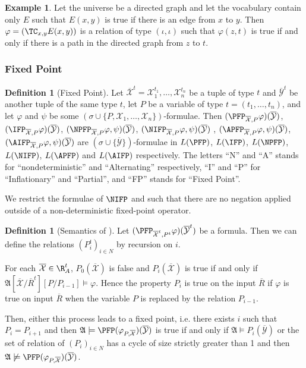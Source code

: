 \documentclass[a4paper,12pt]{article}
\newcommand{\sss}[1]{\subsubsection{#1}}
\newcommand{\emphdex}[1]{\index{#1}\emph{#1}}
\theoremstyle{definition}
\newtheorem{example}[theorem]{Example}
\newtheorem{definition}[theorem]{Definition}
\renewcommand{\phi}{\varphi}
\newcommand{\mc}{\mathcal}
\newcommand{\mf}{\mathfrak}
\newcommand{\ol}{\overline}
\newcommand{\olmc}[1]{\overline{\mathcal{#1}}}
\begin{document}
\begin{example}
  Let the universe be a directed graph and let the vocabulary contain
  only $E$ such that $E(x,y)$ is true if there is an edge from $x$ to
  $y$. Then $\phi=(\TC_{x,y}E(x,y))$ is a relation of type
  $(\iota,\iota)$ such that $\phi(z,t)$ is true if and only if there
  is a path  in the directed graph from $z$ to $t$.
\end{example}

\sss{Fixed Point}
\begin{definition}[Fixed Point]
  Let $\olmc {X}^{t}=\mc X_1^{t_1},\dots,\mc X_n^{t_n}$ be a tuple of
  type $t$ and $\olmc{Y}^{t}$ be another tuple of the same type $t$,
  let $P$ be a variable of type $t=(t_{1},\dots,t_{n})$, and let
  $\phi$ and $\psi$ be some $(\sigma\cup\{P,\mc X_{1},\dots,\mc
  X_{n}\})$-formulae. Then $(\PFP_{\olmc X,P}\phi)(\olmc Y)$,
  $(\IFP_{\olmc X,P}\phi)(\olmc Y)$, $(\NPFP_{\olmc
    X,P}\phi,\psi)(\olmc Y)$, $(\NIFP_{\olmc X,P}\phi,\psi)(\olmc Y)$
  , $(\APFP_{\olmc X,P}\phi,\psi)(\olmc Y)$, $(\AIFP_{\olmc
    X,P}\phi,\psi)(\olmc Y)$ are $(\sigma\cup\{\olmc Y\})$-formulae in
  \emphdex{$L(\PFP)$}, \emphdex{$L(\IFP)$}, \emphdex{$L(\NPFP)$},
  \emphdex{$L(\NIFP)$}, \emphdex{$L(\APFP)$} and \emphdex{$L(\AIFP)$}
  respectively. The letters ``N'' and ``A'' stands for
  ``nondeterministic'' and ``Alternating'' respectively, ``I'' and
  ``P'' for ``Inflationary'' and ``Partial'', and ``FP'' stands for
  ``Fixed Point''.



  We restrict the formulae of $\NIFP$ and \NPFP{} such that there are no
  negation applied outside of a non-deterministic fixed-point
  operator.
\end{definition}

\begin{definition}[Semantics of \PFP]
  Let $(\PFP_{\olmc X^{t},P^{t}}\phi)(\olmc Y^{t})$ be a formula. Then we can
  define the relations $(P_{i}^{t})_{i\in N}$ by recursion on $i$.

  For each $\olmc X\in\R^{t}_{A}$, $P_0(\olmc X)$ is false and
  $P_i(\olmc X)$ is true if and only if $\mf A[\olmc X/\ol
  R^{t}][P/P_{i-1}]\models \phi$. Hence the property $P_i$ is true on
  the input $\ol R$ if $\phi$ is true on input $\ol R$ when the
  variable $P$ is replaced by the relation $P_{i-1}$.

  Then, either this process leads to a fixed point, i.e. there exists
  $i$ such that $P_{i}=P_{i+1}$ and then $\mf A
  \models\PFP(\phi_{P,\olmc X})(\olmc Y)$ is true if and only if $\mf A
  \models P_{i}(\olmc Y)$ or the set of
  relation of $(P_i)_{i \in N}$ has a cycle of size strictly greater than 1 and
  then $\mf A\not\models\PFP(\phi_{P,\olmc X})(\olmc Y)$.
\end{definition}
\end{document}

